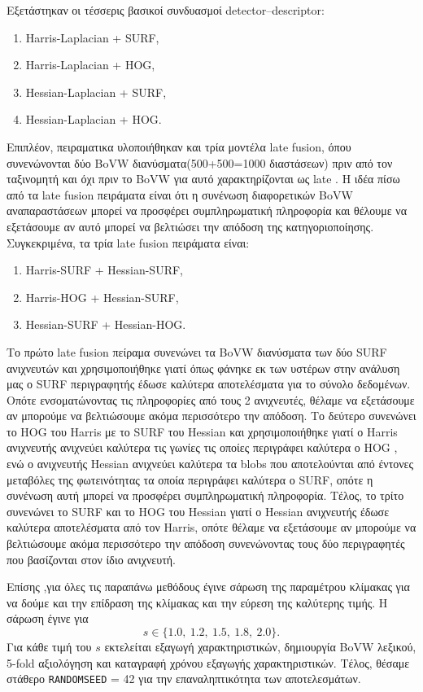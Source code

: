 \documentclass[12pt, a4paper]{article}
\begin{document}
Εξετάστηκαν οι τέσσερις βασικοί συνδυασμοί detector--descriptor:
\begin{enumerate}
    \item Harris-Laplacian + SURF,
    \item Harris-Laplacian + HOG,
    \item Hessian-Laplacian + SURF,
    \item Hessian-Laplacian + HOG.
\end{enumerate}
Επιπλέον, πειραματικα υλοποιήθηκαν και τρία μοντέλα late fusion, όπου
συνενώνονται δύο BoVW διανύσματα(500+500=1000 διαστάσεων) πριν από τον ταξινομητή και όχι πριν το BoVW για αυτό χαρακτηρίζονται ως late . Η ιδέα πίσω από τα late fusion πειράματα είναι ότι η συνένωση διαφορετικών BoVW αναπαραστάσεων μπορεί να προσφέρει συμπληρωματική πληροφορία και θέλουμε να εξετάσουμε αν αυτό μπορεί να βελτιώσει την απόδοση της κατηγοριοποίησης.
 Συγκεκριμένα, τα τρία late fusion πειράματα είναι:
\begin{enumerate}
    \item Harris-SURF + Hessian-SURF,
    \item Harris-HOG + Hessian-SURF,
    \item Hessian-SURF + Hessian-HOG.
\end{enumerate}
Το πρώτο late fusion πείραμα συνενώνει τα BoVW διανύσματα των δύο SURF ανιχνευτών και χρησιμοποιήθηκε γιατί όπως φάνηκε εκ των υστέρων στην ανάλυση μας ο SURF περιγραφητής έδωσε καλύτερα αποτελέσματα για το σύνολο δεδομένων. Οπότε ενσοματώνοντας τις πληροφορίες από τους 2 ανιχνευτές, θέλαμε να εξετάσουμε αν μπορούμε να βελτιώσουμε ακόμα περισσότερο την απόδοση.
Το δεύτερο συνενώνει το HOG του Harris με το SURF του Hessian και χρησιμοποιήθηκε γιατί ο Harris ανιχνευτής ανιχνεύει καλύτερα τις γωνίες τις οποίες περιγράφει καλύτερα ο HOG , ενώ ο ανιχνευτής Hessian  ανιχνεύει καλύτερα τα blobs που αποτελούνται από έντονες μεταβόλες της φωτεινότητας τα οποία περιγράφει καλύτερα ο SURF, οπότε η συνένωση αυτή μπορεί να προσφέρει συμπληρωματική πληροφορία.
 Τέλος, το τρίτο συνενώνει το SURF και το HOG του Hessian γιατί ο Hessian ανιχνευτής έδωσε καλύτερα αποτελέσματα από τον Harris, οπότε θέλαμε να εξετάσουμε αν μπορούμε να βελτιώσουμε ακόμα περισσότερο την απόδοση συνενώνοντας τους δύο περιγραφητές που βασίζονται στον ίδιο ανιχνευτή.
  
Επίσης ,για όλες τις παραπάνω μεθόδους έγινε  σάρωση της παραμέτρου κλίμακας για να δούμε και την επίδραση της κλίμακας και την εύρεση της καλύτερης τιμής. Η σάρωση έγινε για
\[
    s \in \{1.0,\ 1.2,\ 1.5,\ 1.8,\ 2.0\}.
\]
Για κάθε τιμή του $s$ εκτελείται εξαγωγή χαρακτηριστικών, δημιουργία BoVW
λεξικού, 5-fold αξιολόγηση και καταγραφή χρόνου εξαγωγής χαρακτηριστικών. Τέλος, θέσαμε  στάθερο \texttt{RANDOMSEED} = 42 για την επαναληπτικότητα των αποτελεσμάτων. \\
\end{document}
